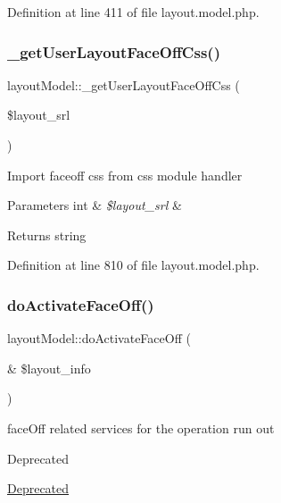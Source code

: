Definition at line 411 of file layout.\+model.\+php.

\mbox{\label{classlayoutModel_ab8fbcb8e92739d001e4a010bc5c5cf3b}} 
\subsubsection{\texorpdfstring{\+\_\+get\+User\+Layout\+Face\+Off\+Css()}{\_getUserLayoutFaceOffCss()}}
{\footnotesize\ttfamily layout\+Model\+::\+\_\+get\+User\+Layout\+Face\+Off\+Css (\begin{DoxyParamCaption}\item[{}]{\$layout\+\_\+srl }\end{DoxyParamCaption})}

Import faceoff css from css module handler 
\begin{DoxyParams}[1]{Parameters}
int & {\em \$layout\+\_\+srl} & \\
\hline
\end{DoxyParams}
\begin{DoxyReturn}{Returns}
string 
\end{DoxyReturn}


Definition at line 810 of file layout.\+model.\+php.

\mbox{\label{classlayoutModel_a09e314ac34d65617cbfd2f1aa5f097a8}} 
\subsubsection{\texorpdfstring{do\+Activate\+Face\+Off()}{doActivateFaceOff()}}
{\footnotesize\ttfamily layout\+Model\+::do\+Activate\+Face\+Off (\begin{DoxyParamCaption}\item[{\&}]{\$layout\+\_\+info }\end{DoxyParamCaption})}

face\+Off related services for the operation run out \begin{DoxyRefDesc}{Deprecated}
\item[\hyperlink{deprecated__deprecated000021}{Deprecated}]\end{DoxyRefDesc}

